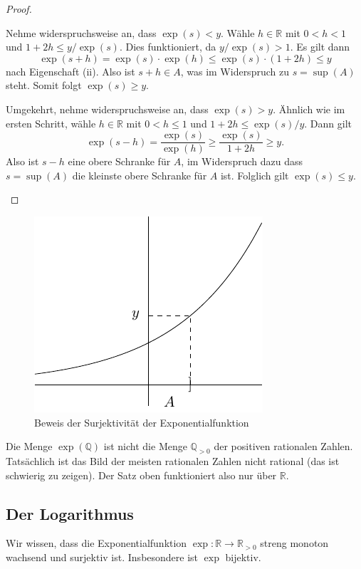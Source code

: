 \documentclass[../main.tex]{subfiles}
\begin{document}
\begin{proof}
\begin{itemize}
      Nehme widerspruchsweise an, dass $\exp(s) < y$.
      Wähle $h \in \mathbb{R}$ mit $0 < h < 1$
      und $1 + 2h \leq y/\exp(s)$.
      Dies funktioniert, da $y/\exp(s) > 1$.
      Es gilt dann
       \[
         \exp(s + h) = \exp(s) \cdot \exp(h) \leq \exp(s)
         \cdot (1 + 2h) \leq y
      \]
      nach Eigenschaft (ii).
      Also ist $s + h \in A$, was im Widerspruch zu
      $s = \sup(A)$ steht.
      Somit folgt $\exp(s) \geq y$.
      
      Umgekehrt, nehme widerspruchsweise an,
      dass $\exp(s) > y$. Ähnlich wie im ersten Schritt, wähle
      $h \in \mathbb{R}$ mit $0 < h \leq 1$ 
      und $1 + 2h \leq \exp(s)/y$.
      Dann gilt
      \[
        \exp(s-h) = \frac{\exp(s)}{\exp(h)}
        \geq \frac{\exp(s)}{1 + 2h} \geq y.
      \]
      Also ist $s-h$ eine obere Schranke für $A$,
      im Widerspruch dazu dass $s = \sup(A)$ die
      kleinste obere Schranke für $A$ ist.
      Folglich gilt $\exp(s) \leq y$. \qedhere
  \end{itemize}
\end{proof}

\begin{figure}[htb]
  \centering
  \includegraphics{chapter2/images/exp}
  \caption{Beweis der Surjektivität der Exponentialfunktion}%
  \label{fig:exp}
\end{figure}


\begin{remark}
  Die Menge $\exp(\mathbb{Q})$ ist nicht die Menge
  $\mathbb{Q}_{>0}$ der positiven rationalen Zahlen.
  Tatsächlich ist das Bild der meisten rationalen Zahlen
  nicht rational (das ist schwierig zu zeigen).
  Der Satz oben funktioniert also nur über $\mathbb{R}$.
\end{remark}

\subsection*{Der Logarithmus}
Wir wissen, dass die Exponentialfunktion
$
  \exp \colon \mathbb{R} \to \mathbb{R}_{>0}
  $
streng monoton wachsend und surjektiv ist.
Insbesondere ist $\exp$ bijektiv.
\end{document}
